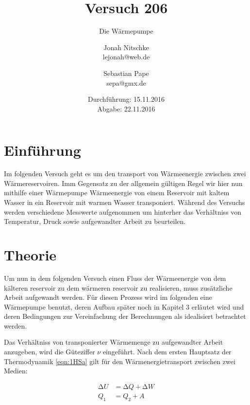 

\title{Versuch 206}
\subtitle{Die Wärmepumpe}
\author{Jonah Nitschke\\
        lejonah@web.de \and
        Sebastian Pape\\
        sepa@gmx.de}
\date{Durchführung: 15.11.2016\\
      Abgabe: 22.11.2016}



\maketitle
\tableofcontents
\newpage

\section{Einführung}

Im folgenden Versuch geht es um den transport von Wärmeenergie zwischen zwei Wärmereservoiren.
Imm Gegensatz zu der allgemein gültigen Regel wir hier nun mithilfe einer Wärmepumpe
Wärmeenergie von einem Reservoir mit kaltem Wasser in ein Reservoir mit warmen Wasser transponiert.
Während des Versuchs werden verschiedene Messwerte aufgenommen um hinterher das Verhältniss von Temperatur,
Druck sowie aufgewandter Arbeit zu beurteilen.

\section{Theorie}


Um nun in dem folgenden Versuch einen Fluss der Wärmeenergie von dem kälteren reservoir zu dem
wärmeren reservoir zu realisieren, muss zusätzliche Arbeit aufgewandt werden. Für diesen Prozess wird
im folgenden eine Wärmepumpe benutzt, deren Aufbau später noch in Kapitel 3 erläutet wird und deren Bedingungen
zur Vereinfachung der Berechnungen als idealisiert betrachtet werden.

Das Verhältniss von transponierter Wärmemenge zu aufgewandter Arbeit anzugeben, wird die Güteziffer
$\nu$ eingeführt. Nach dem ersten Hauptsatz der Thermodynamik \eqref{eqn:1HSa} gilt für den Wärmenergietransport
zwischen zwei Medien:

\begin{align}
  \increment U &= \increment Q + \increment W \label{eqn:1HSa} \\
  Q_1          &= Q_2 + A   \label{eqn:1HSb}
\end{align}

